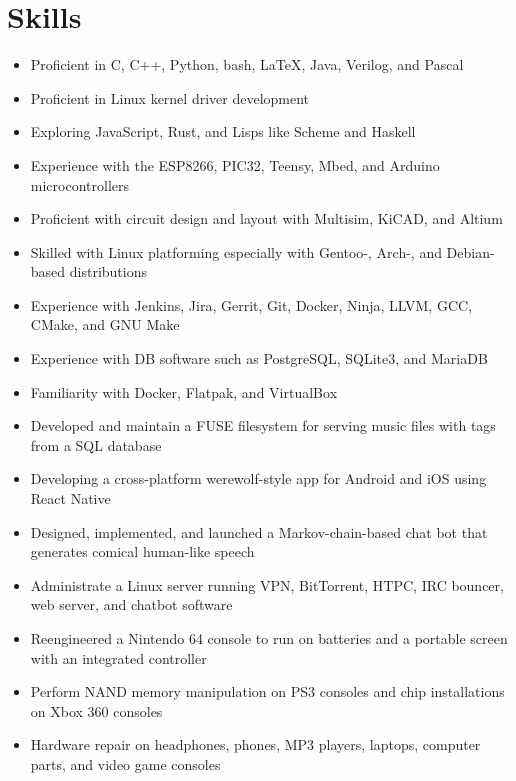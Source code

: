 \documentclass[letterpaper,10pt]{article}
\begin{document}
\section{Skills}
\begin{itemize}
\item Proficient in C, C++, Python, bash, \LaTeX, Java, Verilog, and Pascal
\item Proficient in Linux kernel driver development
\item Exploring JavaScript, Rust, and Lisps like Scheme and Haskell
\item Experience with the ESP8266, PIC32, Teensy, Mbed, and Arduino microcontrollers
\item Proficient with circuit design and layout with Multisim, KiCAD, and Altium
\item Skilled with Linux platforming especially with Gentoo-, Arch-, and Debian-based distributions
\item Experience with Jenkins, Jira, Gerrit, Git, Docker, Ninja, LLVM, GCC, CMake, and GNU Make
\item Experience with DB software such as PostgreSQL, SQLite3, and MariaDB
\item Familiarity with Docker, Flatpak, and VirtualBox
\item Developed and maintain a FUSE filesystem for serving music files with tags from a SQL database
\item Developing a cross-platform werewolf-style app for Android and iOS using React Native
\item Designed, implemented, and launched a Markov-chain-based chat bot that generates comical human-like speech
\item Administrate a Linux server running VPN, BitTorrent, HTPC, IRC bouncer, web server, and chatbot software
\item Reengineered a Nintendo 64 console to run on batteries and a portable screen with an integrated controller
\item Perform NAND memory manipulation on PS3 consoles and chip installations on Xbox 360 consoles
\item Hardware repair on headphones, phones, MP3 players, laptops, computer parts, and video game consoles
\end{itemize}
\end{document}

